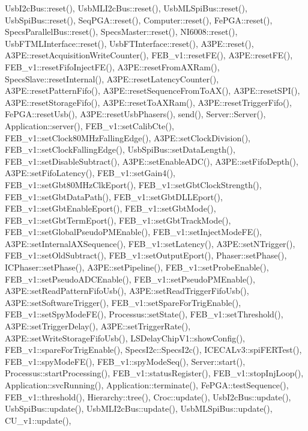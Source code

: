 Usb\+I2c\+Bus\+::reset(), Usb\+M\+L\+I2c\+Bus\+::reset(), Usb\+M\+L\+Spi\+Bus\+::reset(), Usb\+Spi\+Bus\+::reset(), Seq\+P\+G\+A\+::reset(), Computer\+::reset(), Fe\+P\+G\+A\+::reset(), Specs\+Parallel\+Bus\+::reset(), Specs\+Master\+::reset(), N\+I6008\+::reset(), Usb\+F\+T\+M\+L\+Interface\+::reset(), Usb\+F\+T\+Interface\+::reset(), A3\+P\+E\+::reset(), A3\+P\+E\+::reset\+Acquisition\+Write\+Counter(), F\+E\+B\+\_\+v1\+::reset\+F\+E(), A3\+P\+E\+::reset\+F\+E(), F\+E\+B\+\_\+v1\+::reset\+Fifo\+Inject\+F\+E(), A3\+P\+E\+::reset\+From\+A\+X\+Ram(), Specs\+Slave\+::reset\+Internal(), A3\+P\+E\+::reset\+Latency\+Counter(), A3\+P\+E\+::reset\+Pattern\+Fifo(), A3\+P\+E\+::reset\+Sequence\+From\+To\+A\+X(), A3\+P\+E\+::reset\+S\+P\+I(), A3\+P\+E\+::reset\+Storage\+Fifo(), A3\+P\+E\+::reset\+To\+A\+X\+Ram(), A3\+P\+E\+::reset\+Trigger\+Fifo(), Fe\+P\+G\+A\+::reset\+Usb(), A3\+P\+E\+::reset\+Usb\+Phasers(), send(), Server\+::\+Server(), Application\+::server(), F\+E\+B\+\_\+v1\+::set\+Calib\+Cte(), F\+E\+B\+\_\+v1\+::set\+Clock80\+M\+Hz\+Falling\+Edge(), A3\+P\+E\+::set\+Clock\+Division(), F\+E\+B\+\_\+v1\+::set\+Clock\+Falling\+Edge(), Usb\+Spi\+Bus\+::set\+Data\+Length(), F\+E\+B\+\_\+v1\+::set\+Disable\+Subtract(), A3\+P\+E\+::set\+Enable\+A\+D\+C(), A3\+P\+E\+::set\+Fifo\+Depth(), A3\+P\+E\+::set\+Fifo\+Latency(), F\+E\+B\+\_\+v1\+::set\+Gain4(), F\+E\+B\+\_\+v1\+::set\+Gbt80\+M\+Hz\+Clk\+Eport(), F\+E\+B\+\_\+v1\+::set\+Gbt\+Clock\+Strength(), F\+E\+B\+\_\+v1\+::set\+Gbt\+Data\+Path(), F\+E\+B\+\_\+v1\+::set\+Gbt\+D\+L\+L\+Eport(), F\+E\+B\+\_\+v1\+::set\+Gbt\+Enable\+Eport(), F\+E\+B\+\_\+v1\+::set\+Gbt\+Mode(), F\+E\+B\+\_\+v1\+::set\+Gbt\+Term\+Eport(), F\+E\+B\+\_\+v1\+::set\+Gbt\+Track\+Mode(), F\+E\+B\+\_\+v1\+::set\+Global\+Pseudo\+P\+M\+Enable(), F\+E\+B\+\_\+v1\+::set\+Inject\+Mode\+F\+E(), A3\+P\+E\+::set\+Internal\+A\+X\+Sequence(), F\+E\+B\+\_\+v1\+::set\+Latency(), A3\+P\+E\+::set\+N\+Trigger(), F\+E\+B\+\_\+v1\+::set\+Old\+Subtract(), F\+E\+B\+\_\+v1\+::set\+Output\+Eport(), Phaser\+::set\+Phase(), I\+C\+Phaser\+::set\+Phase(), A3\+P\+E\+::set\+Pipeline(), F\+E\+B\+\_\+v1\+::set\+Probe\+Enable(), F\+E\+B\+\_\+v1\+::set\+Pseudo\+A\+D\+C\+Enable(), F\+E\+B\+\_\+v1\+::set\+Pseudo\+P\+M\+Enable(), A3\+P\+E\+::set\+Read\+Pattern\+Fifo\+Usb(), A3\+P\+E\+::set\+Read\+Trigger\+Fifo\+Usb(), A3\+P\+E\+::set\+Software\+Trigger(), F\+E\+B\+\_\+v1\+::set\+Spare\+For\+Trig\+Enable(), F\+E\+B\+\_\+v1\+::set\+Spy\+Mode\+F\+E(), Processus\+::set\+State(), F\+E\+B\+\_\+v1\+::set\+Threshold(), A3\+P\+E\+::set\+Trigger\+Delay(), A3\+P\+E\+::set\+Trigger\+Rate(), A3\+P\+E\+::set\+Write\+Storage\+Fifo\+Usb(), L\+S\+Delay\+Chip\+V1\+::show\+Config(), F\+E\+B\+\_\+v1\+::spare\+For\+Trig\+Enable(), Specs\+I2c\+::\+Specs\+I2c(), I\+C\+E\+C\+A\+Lv3\+::spi\+F\+E\+R\+Test(), F\+E\+B\+\_\+v1\+::spy\+Mode\+F\+E(), F\+E\+B\+\_\+v1\+::spy\+Mode\+Seq(), Server\+::start(), Processus\+::start\+Processing(), F\+E\+B\+\_\+v1\+::status\+Register(), F\+E\+B\+\_\+v1\+::stop\+Inj\+Loop(), Application\+::svc\+Running(), Application\+::terminate(), Fe\+P\+G\+A\+::test\+Sequence(), F\+E\+B\+\_\+v1\+::threshold(), Hierarchy\+::tree(), Croc\+::update(), Usb\+I2c\+Bus\+::update(), Usb\+Spi\+Bus\+::update(), Usb\+M\+L\+I2c\+Bus\+::update(), Usb\+M\+L\+Spi\+Bus\+::update(), C\+U\+\_\+v1\+::update(), 